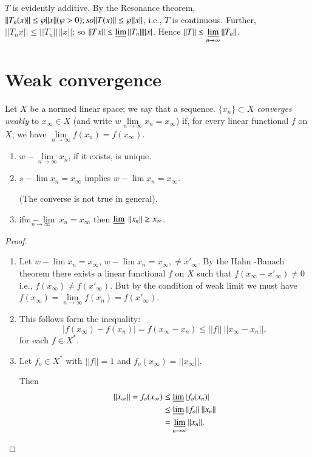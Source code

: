 $T$ is evidently additive. By the Resonance theorem, $|| T_n(x)|| \leq
\wp ||x||\break ( \wp > 0); so || T(x) || \leq \wp || x|| $, i.e., $T$ is
continuous. Further, $|| T_n x || \leq || T_n|| || x ||$; so $|| Tx||
\leq \varliminf || T_n || || x| $. Hence $|| T|| \leq
\varliminf\limits_{n \to \infty } || T_n || $. 

\section{Weak convergence}\label{chap3:sec3}
\begin{defi*}
 Let $X$ be a normed linear space; we say that a sequence. $\{x_n \}
 \subset X$ \textit{ converges weakly } to $x_{\infty} \in X$ (and
 write $w \lim\limits_{n \to \infty} x_n = x_\infty$) if, for every
 linear functional $f$ on $X$, we have
 $\lim\limits_{n \to \infty} f(x_n) = f(x_\infty)$. 
\end{defi*}

\begin{prop*}
 \begin{enumerate}[\rm i)]
 \item $w -\lim\limits_{ n \to \infty} x_n $, if it exists, is unique. 
 \item $s -\lim\limits x_n = x_\infty$ implies $w -\lim x_n = x_\infty$. 

  (The converse is not true in general). 
 \item if\pageoriginale $\underset{n \to \infty}{w-\lim\limits}~ x_n = x_\infty$
  then $\varliminf~ || x_n || \geq x_\infty$. 
 \end{enumerate}
\end{prop*}

\begin{proof}
\begin{enumerate}[\rm (i)]
 \item Let $w - \lim\limits x_n = x_\infty$, $w -\lim x_n =
  x_\infty, \neq x'_\infty$. By the Hahn -Banach theorem there exists a
  linear functional $f$ on $X$ such that $f(x_\infty - x'_\infty)
  \neq 0$ i.e., $f(x_\infty) \neq f(x'_\infty)$. But by the
  condition of weak limit we must have $f(x_\infty)= \lim\limits_{
   n \to \infty} f(x_n) = f(x'_\infty)$. 
 \item This follows form the inequality: 
  $$
  | f(x_\infty) - f(x_n) | = f(x_\infty - x_n) \leq || f||~ ||
  x_\infty - x_n||, 
  $$
  for each $f \in X^*$.
  
 \item Let $f_o \in X^*$ with $||f|| = 1$ and $f_o (x_\infty) = ||
  x_\infty||$. 

 Then 
 \begin{align*}
  || x_\infty|| = f_o (x_\infty ) & \leq \varliminf | f_o (x_n) |\\
  & \leq \varliminf || f_o || ~||x_n ||\\
  & = \varliminf \limits_{ n \to \infty}|| x_n||. 
 \end{align*}
\end{enumerate}
\end{proof}

